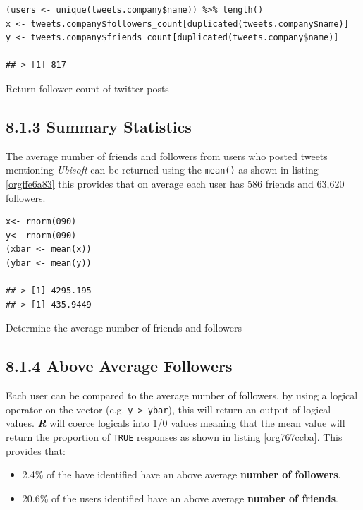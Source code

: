 \documentclass[11pt]{article}
\begin{document}
\begin{listing}[htbp]
\begin{verbatim}
(users <- unique(tweets.company$name)) %>% length()
x <- tweets.company$followers_count[duplicated(tweets.company$name)]
y <- tweets.company$friends_count[duplicated(tweets.company$name)]

## > [1] 817
\end{verbatim}
\caption{\label{orga63e2eb}Return follower count of twitter posts}
\end{listing}


\subsection{8.1.3 Summary Statistics}
\label{sec:orgf12e89e}
The average number of friends and followers from users who posted tweets mentioning \emph{Ubisoft} can be returned using the \texttt{mean()} as shown in listing \ref{orgffe6a83}
this provides that on average each user has 586 friends and 63,620 followers.

\begin{listing}[htbp]
\begin{verbatim}
x<- rnorm(090)
y<- rnorm(090)
(xbar <- mean(x))
(ybar <- mean(y))

## > [1] 4295.195
## > [1] 435.9449
\end{verbatim}
\caption{\label{orgffe6a83}Determine the average number of friends and followers}
\end{listing}

\subsection{8.1.4 Above Average Followers}
\label{sec:orga10ba78}
Each user can be compared to the average number of followers, by using a logical
operator on the vector (e.g. \texttt{y > ybar}), this will return an output of logical
values. \textbf{\emph{R}} will coerce logicals into 1/0 values meaning that the mean value
will return the proportion of \texttt{TRUE} responses as shown in listing \ref{org767ccba}. This
provides that:

\begin{itemize}
\item 2.4\%  of the have identified have an above average \textbf{number of followers}.
\item 20.6\% of the users identified have an above average \textbf{number of friends}.
\end{itemize}
\end{document}
